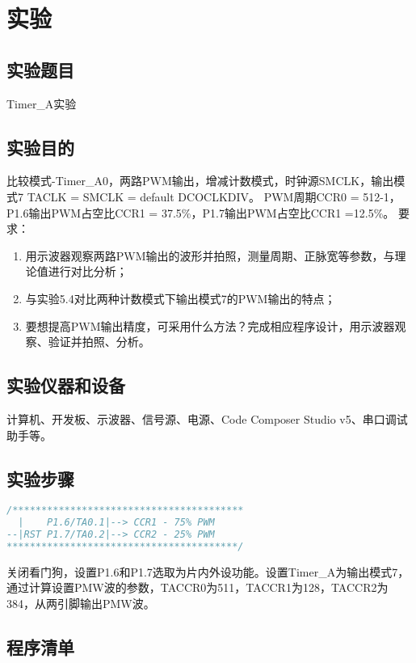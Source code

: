 ﻿%
\section{实验}
\subsection{实验题目}
Timer\_A实验
\subsection{实验目的}
比较模式-Timer\_A0，两路PWM输出，增减计数模式，时钟源SMCLK，输出模式7
TACLK = SMCLK = default DCOCLKDIV。
PWM周期CCR0 = 512-1，P1.6输出PWM占空比CCR1 = 37.5\%，P1.7输出PWM占空比CCR1 =12.5\%。
要求：
\begin{enumerate}
	\item 用示波器观察两路PWM输出的波形并拍照，测量周期、正脉宽等参数，与理论值进行对比分析；
	\item 与实验5.4对比两种计数模式下输出模式7的PWM输出的特点；
	\item 要想提高PWM输出精度，可采用什么方法？完成相应程序设计，用示波器观察、验证并拍照、分析。
\end{enumerate}
\subsection{实验仪器和设备}
计算机、开发板、示波器、信号源、电源、Code Composer Studio v5、串口调试助手等。
\subsection{实验步骤}
\begin{lstlisting}[language=C]
/****************************************
  |    P1.6/TA0.1|--> CCR1 - 75% PWM
--|RST P1.7/TA0.2|--> CCR2 - 25% PWM
****************************************/
\end{lstlisting}
\par\indent 关闭看门狗，设置P1.6和P1.7选取为片内外设功能。设置Timer\_A为输出模式7，通过计算设置PMW波的参数，TACCR0为511，TACCR1为128，TACCR2为384，从两引脚输出PMW波。
\subsection{程序清单}


